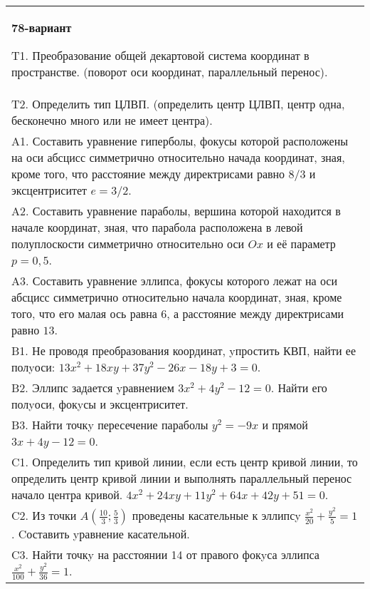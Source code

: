 \documentclass{article}
\begin{document}
\begin{tabular}{m{17cm}}
\textbf{78-вариант}
\newline

T1. Преобразование общей декартовой система координат в пространстве. (поворот оси координат, параллельный перенос).\\

T2. Определить тип ЦЛВП. (определить центр ЦЛВП, центр одна, бесконечно много или не имеет центра).\\

A1. Составить уравнение гиперболы, фокусы которой расположены на оси абсцисс симметрично относительно начада координат, зная, кроме того, что расстояние между директрисами равно $8/3$ и эксцентриситет $e=3/2$.\\

A2. Составить уравнение параболы, вершина которой находится в начале координат, зная, что парабола расположена в левой полуплоскости симметрично относительно оси $Ox$ и её параметр $p=0,5$.\\

A3. Составить уравнение эллипса, фокусы которого лежат на оси абсцисс симметрично относительно начала координат, зная, кроме того, что его малая ось равна $6$, а расстояние между директрисами равно $13$.\\

B1. Не проводя преобразования координат, yпростить КВП, найти ее полyоси: $13x^{2} + 18xy + 37y^{2} - 26x - 18y + 3 = 0$.  \\

B2. Эллипс задается yравнением $3x^{2} + 4y^{2} - 12 = 0$. Найти его полyоси, фокyсы и эксцентриситет.  \\

B3. Найти точкy пересечение параболы $y^{2} = - 9x$ и прямой $3x + 4y - 12 = 0$.  \\

C1. Определить тип кривой линии, если есть центр кривой линии, то определить центр кривой линии и выполнять параллельный перенос начало центра кривой. $4x^{2}+24xy+11y^{2}+64x+42y+51=0$.  \\

C2. Из точки $A(\frac{10}{3};\frac{5}{3})$ проведены касательные к эллипсy $\frac{x^{2}}{20}+\frac{y^{2}}{5}=1$ . Cоставить yравнение касательной.  \\

C3. Найти точкy на расстоянии 14 от правого фокyса эллипса $\frac{x^{2}}{100}+\frac{y^{2}}{36}=1$.\\

\end{tabular}
\vspace{1cm}
\end{document}
